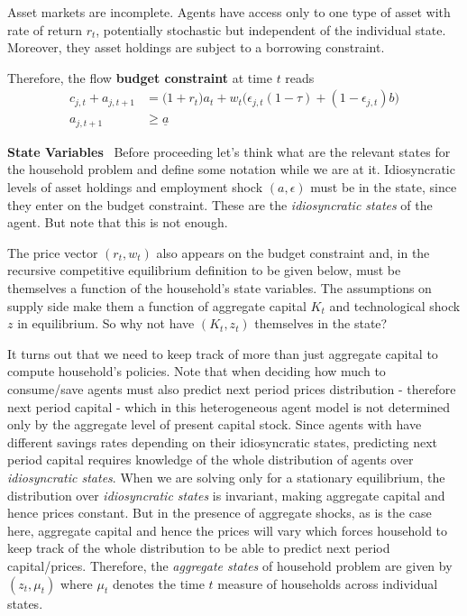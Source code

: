 \documentclass[a4paper,11pt]{article}  %
\begin{document}
Asset markets are incomplete.
Agents have access only to one type of asset with rate of return $r_t$, potentially stochastic
but independent of the individual state. Moreover, they asset holdings are subject to a borrowing constraint.


Therefore, the flow \textbf{budget constraint} at time $t$ reads
\begin{align*}
   \label{eq:budget_const}
   c_{j,t} + a_{j,t+1} & = \Big( 1 + r_t \Big) a_t + w_t \Big( \epsilon_{j,t} ( 1-\tau ) + ( 1-\epsilon_{j,t} )b \Big) \\
   a_{j,t+1}           & \ge \underline{a}
\end{align*}

\textbf{State Variables} \
Before proceeding let's think what are the relevant states for the household problem and define some notation
while we are at it.
Idiosyncratic levels of asset holdings and employment shock $ ( a, \epsilon ) $ must be in the state, since they enter
on the budget constraint. These are the \emph{idiosyncratic states} of the agent. But note that this is not enough.

The price vector $( r_t, w_t )$ also appears on the budget constraint and, in the recursive competitive equilibrium
definition to be given below, must be themselves a function of the household's state variables.
The assumptions on supply side make them a function of aggregate capital $K_t$ and technological shock $z$ in equilibrium.
So why not have $(K_t,z_t)$ themselves in the state?

It turns out that we need to keep track of more than just aggregate capital to compute household's policies.
Note that when deciding how much to consume/save agents must also predict next period prices distribution - therefore
next period capital - which in this heterogeneous agent model is not determined only by the aggregate level of present capital stock.
Since agents with have different savings rates depending on their idiosyncratic states, predicting next period capital
requires knowledge of the whole distribution of agents over \emph{idiosyncratic states}.
When we are solving only for a stationary equilibrium, the distribution over \emph{idiosyncratic states} is invariant,
making aggregate capital and hence prices constant. But in the presence of aggregate shocks, as is the case here,
aggregate capital and hence the prices will vary which forces household to keep track of the whole distribution
to be able to predict next period capital/prices.
Therefore, the \emph{aggregate states} of household problem are given by $ (z_t, \mu_t ) $ where
$ \mu_t $ denotes the time $t$ measure of households across individual states.
\end{document}
